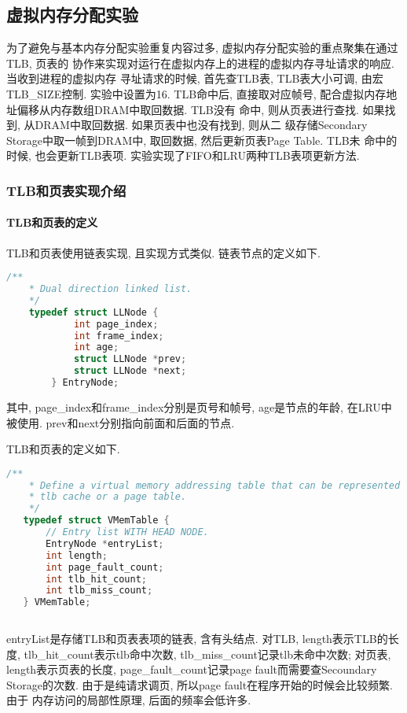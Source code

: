 \subsection{虚拟内存分配实验}
为了避免与基本内存分配实验重复内容过多, 虚拟内存分配实验的重点聚集在通过TLB, 页表的
协作来实现对运行在虚拟内存上的进程的虚拟内存寻址请求的响应. 当收到进程的虚拟内存
寻址请求的时候, 首先查TLB表, TLB表大小可调, 由宏TLB\_SIZE控制. 实验中设置为16.
TLB命中后, 直接取对应帧号, 配合虚拟内存地址偏移从内存数组DRAM中取回数据. TLB没有
命中, 则从页表进行查找. 如果找到, 从DRAM中取回数据. 如果页表中也没有找到, 则从二
级存储Secondary Storage中取一帧到DRAM中, 取回数据, 然后更新页表Page Table. TLB未
命中的时候, 也会更新TLB表项. 实验实现了FIFO和LRU两种TLB表项更新方法.

\subsubsection{TLB和页表实现介绍}
\paragraph{TLB和页表的定义}
TLB和页表使用链表实现, 且实现方式类似. 链表节点的定义如下.
\begin{lstlisting}[language=c++]
    /**
    * Dual direction linked list.
    */
    typedef struct LLNode {
            int page_index;
            int frame_index;
            int age;
            struct LLNode *prev;
            struct LLNode *next;
        } EntryNode;
\end{lstlisting}

其中, page\_index和frame\_index分别是页号和帧号, age是节点的年龄, 在LRU中被使用.
prev和next分别指向前面和后面的节点.\par

TLB和页表的定义如下.
\begin{lstlisting}[language=c++]
    /**
    * Define a virtual memory addressing table that can be represented as either a
    * tlb cache or a page table.
    */
   typedef struct VMemTable {
       // Entry list WITH HEAD NODE.
       EntryNode *entryList;
       int length;
       int page_fault_count;
       int tlb_hit_count;
       int tlb_miss_count;
   } VMemTable;
   
\end{lstlisting}
entryList是存储TLB和页表表项的链表, 含有头结点. 对TLB, length表示TLB的长度,
tlb\_hit\_count表示tlb命中次数, tlb\_miss\_count记录tlb未命中次数;
对页表, length表示页表的长度, page\_fault\_count记录page fault而需要查Secoundary
Storage的次数. 由于是纯请求调页, 所以page fault在程序开始的时候会比较频繁. 由于
内存访问的局部性原理, 后面的频率会低许多.

